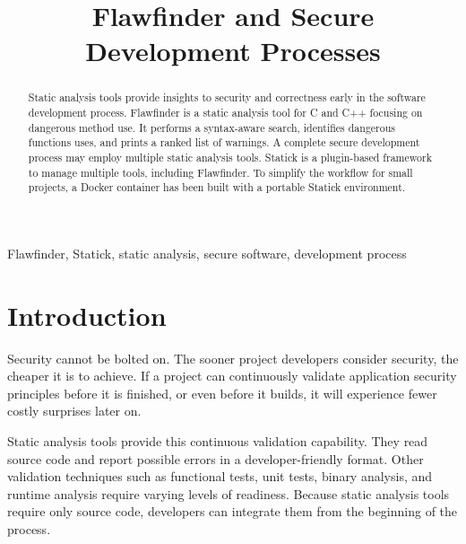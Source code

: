 \documentclass[journal]{IEEEtran}
\begin{document}

\title{Flawfinder and Secure Development Processes}

\author{
}

\maketitle



\begin{abstract}
Static analysis tools provide insights to security and correctness early in the software development
process. Flawfinder is a static analysis tool for C and C++ focusing on dangerous method use. It
performs a syntax-aware search, identifies dangerous functions uses, and prints a ranked list of
warnings. A complete secure development process may employ multiple static analysis tools. Statick
is a plugin-based framework to manage multiple tools, including Flawfinder. To simplify the workflow
for small projects, a Docker container has been built with a portable Statick environment.
\end{abstract}

\begin{IEEEkeywords}
Flawfinder, Statick, static analysis, secure software, development process
\end{IEEEkeywords}



\section{Introduction}

Security cannot be bolted on. The sooner project developers consider security, the cheaper it is to
achieve. If a project can continuously validate application security principles before it is
finished, or even before it builds, it will experience fewer costly surprises later on.

Static analysis tools provide this continuous validation capability. They read source code and
report possible errors in a developer-friendly format. Other validation techniques such as
functional tests, unit tests, binary analysis, and runtime analysis require varying levels of
readiness. Because static analysis tools require only source code, developers can integrate them
from the beginning of the process.
\end{document}
